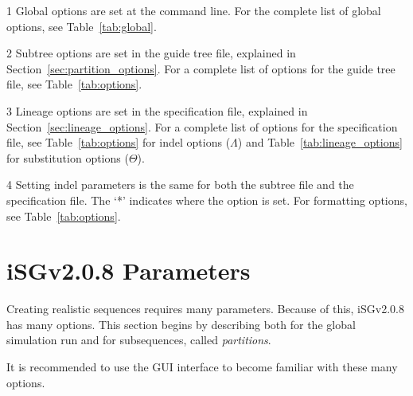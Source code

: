 \documentclass[10pt]{article}
\newcommand{\version}{2.0.8 }
\newcommand{\iSGcurrentshort}{iSGv\version }
\begin{document}
\begin{center}
\begin{threeparttable}
\begin{tabular}{cclll}
 \\
 \hline \hline
\end{tabular}
\begin{tablenotes}
\item[1] Global options are set at the command line. For the complete list of global options, see Table~\ref{tab:global}.
\item[2] Subtree options are set in the guide tree file, explained in Section~\ref{sec:partition_options}. For a complete list of options for the guide tree file, see Table~\ref{tab:options}.
\item[3] Lineage options are set in the specification file, explained in Section~\ref{sec:lineage_options}. For a complete list of options for the specification file, see Table~\ref{tab:options} for indel options ($\Lambda$) and Table~\ref{tab:lineage_options} for substitution options ($\Theta$). 
\item[4] Setting indel parameters is the same for both the subtree file and the specification file. The `*' indicates where the option is set. For formatting options, see Table~\ref{tab:options}.
\end{tablenotes}
\label{tab:precedence_specific}
\end{threeparttable}
\end{center}

\section{\iSGcurrentshort Parameters}

Creating realistic sequences requires many parameters. Because of this, \iSGcurrentshort  has many options. This section begins by describing both for the global simulation run and for subsequences, called {\it partitions}.
\begin{GUI3}
It is recommended to use the GUI interface to become familiar with these many options.
\end{GUI3}
\end{document}
